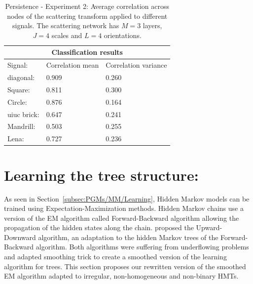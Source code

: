 \documentclass[a4paper,11pt]{report}
\begin{document}
		\begin{center}
			\begin{table}[h]
				\begin{center}				
					\begin{tabular}{|p{3cm}||p{4cm}|p{4cm}|}
						\hline
						\multicolumn{3}{|c|}{Classification results} \\
						\hline
						Signal:					&	Correlation mean	& Correlation variance	\\
						\hline
						diagonal:				& 0.909							& 0.260									\\
						Square:					& 0.811							& 0.300									\\
						Circle:					& 0.876							& 0.164									\\
						uiuc brick:			& 0.647							& 0.241									\\
						Mandrill:				& 0.503							& 0.255									\\
						Lena:						& 0.727							& 0.236									\\

						\hline
					\end{tabular}
				\end{center}
				\caption[Persistence - Experiment 2.]{\centering Persistence - Experiment 2: Average correlation across nodes of the scattering transform applied to different signals. The scattering network has $M=3$ layers, $J=4$ scales and $L=4$ orientations.}
				\label{table:Persistence - 2}
			\end{table}
		\end{center}
	
		
  \section{Learning the tree structure:}
    \label{sec:SCHMT/Learning}
    
    As seen in Section~\ref{subsec:PGMs/MM/Learning}, Hidden Markov  models can be trained using Expectation-Maximization methods. Hidden Markov chains use a version of the EM algorithm called Forward-Backward algorithm allowing the propagation of the hidden states along the chain. \citet{crouse1998wavelet} proposed the Upward-Downward algorithm, an adaptation to the hidden Markov trees of the Forward-Backward algorithm. Both algorithms were suffering from underflowing problems~\citep{ephraim2002hidden} and \citet{durand2004computational} adapted \citet{devijver1985baum} smoothing trick to create a smoothed version of the learning algorithm for trees. This section proposes our rewritten version of the smoothed EM algorithm adapted to irregular, non-homogeneous and non-binary HMTs.\\
       
\end{document}
